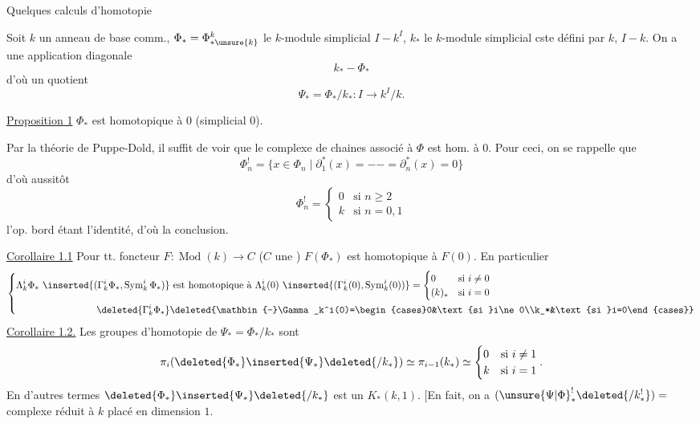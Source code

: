 Quelques calculs d'homotopie

Soit $k$ un anneau de base comm.,
$\Phi_*=\Phi^k_{*\unsure{k}}$ le $k$-module simplicial $I\mathbin{-}k^I$,
$k_*$ le $k$-module simplicial cste défini par $k$, $I\mathbin{-}k$.
On a une application diagonale
\[k_*\mathbin{-}\Phi_*\]
d'où un quotient
\[\Psi_*=\Phi_*/k_*:I\longrightarrow k^I/k.\]

\uline{Proposition 1} $\Phi_*$ est homotopique à $0$ 
(simplicial $0$).

Par la théorie de Puppe-Dold, il suffit de voir que le complexe de chaines
\inserted{$\Phi_*^!$} associé \deleted{$\unsure{\Phi}$} à $\Phi$ est hom. à $0$.
Pour ceci, on se rappelle que
\[
\Phi_n^!=\{x\in\Phi_n\mid\partial_1^*(x)=- -=\partial_n^*(x)=0\}
\]
d'où aussitôt
\[
\Phi_n^!=\begin{cases}0&\text{si }n\geq2\\k&\text{si }n=0,1\end{cases}
\]
l'op.  bord
étant l'identité, d'où la conclusion.

\uline{Corollaire 1.1} Pour tt. foncteur $F:\operatorname{Mod}(k)\longrightarrow C$
($C$ une ) $F(\Phi_*)$ est homotopique à $F(0)$.
En particulier
\[
\left\{\begin{aligned}
\Lambda_k^i\Phi_*\ \inserted{(\Gamma_k^i\Phi_*,\operatorname{Sym}_k^i\Phi_*)}
&\text{ est homotopique à }\Lambda_k^i(0)\ \inserted{(\Gamma_k^i(0),\operatorname{Sym}_k^i(0))}
=\begin{cases}0&\text{si }i\ne0\\(k)_*&\text{si }i=0\end{cases}\\
\deleted{\Gamma_k^i\Phi_*}&\deleted{\mathbin{-}\Gamma_k^i(0)=\begin{cases}0&\text{si }i\ne0\\k_*&\text{si }i=0\end{cases}}
\end{aligned}\right.
\]
\uline{Corollaire 1.2.} Les groupes d'homotopie de $\Psi_*=\Phi_*/k_*$ sont
\[
\pi_i(\deleted{\Phi_*}\inserted{\Psi_*}\deleted{/k_*})
\simeq\pi_{i-1}(k_*)\simeq\begin{cases}0&\text{si }i\ne1\\k&\text{si }i=1\end{cases}.
\]
En d'autres termes $\deleted{\Phi_*}\inserted{\Psi_*}\deleted{/k_*}$ est un $K_*(k,1)$.
[En fait, on a $(\unsure{\Psi|\Phi}_*^!\deleted{/k_*^!})=$ complexe réduit à $k$ placé en dimension $1$.

